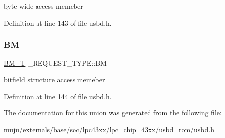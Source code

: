 byte wide access memeber 

Definition at line 143 of file usbd.\+h.

\mbox{\label{union___r_e_q_u_e_s_t___t_y_p_e_aeb4f47d17f203fbb11ffd16c454dde0c}} 
\subsubsection{\texorpdfstring{BM}{BM}}
{\footnotesize\ttfamily \hyperlink{group___u_s_b_d___core_ga0c191764322e096fa81c1228eb62e63f}{B\+M\+\_\+T} \+\_\+\+R\+E\+Q\+U\+E\+S\+T\+\_\+\+T\+Y\+P\+E\+::\+BM}

bitfield structure access memeber 

Definition at line 144 of file usbd.\+h.



The documentation for this union was generated from the following file\+:\begin{DoxyCompactItemize}
\item 
muju/externals/base/soc/lpc43xx/lpc\+\_\+chip\+\_\+43xx/usbd\+\_\+rom/\hyperlink{usbd_8h}{usbd.\+h}\end{DoxyCompactItemize}
